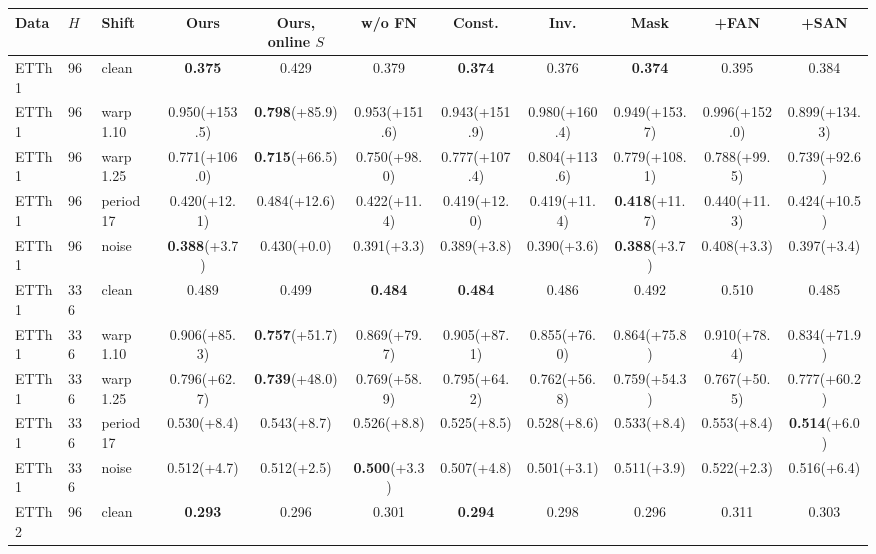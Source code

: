 \begin{tabular}{lllcccccccc}
\toprule
Data & $H$ & Shift & Ours & Ours, online $S$ & w/o FN & Const. & Inv. & Mask & +FAN & +SAN \\
\midrule
ETTh1 & 96 & clean & \textbf{0.375} & 0.429 & 0.379 & \textbf{0.374} & 0.376 & \textbf{0.374} & 0.395 & 0.384 \\
ETTh1 & 96 & warp 1.10 & 0.950\tiny{(+153.5)} & \textbf{0.798}\tiny{(+85.9)} & 0.953\tiny{(+151.6)} & 0.943\tiny{(+151.9)} & 0.980\tiny{(+160.4)} & 0.949\tiny{(+153.7)} & 0.996\tiny{(+152.0)} & 0.899\tiny{(+134.3)} \\
ETTh1 & 96 & warp 1.25 & 0.771\tiny{(+106.0)} & \textbf{0.715}\tiny{(+66.5)} & 0.750\tiny{(+98.0)} & 0.777\tiny{(+107.4)} & 0.804\tiny{(+113.6)} & 0.779\tiny{(+108.1)} & 0.788\tiny{(+99.5)} & 0.739\tiny{(+92.6)} \\
ETTh1 & 96 & period 17 & 0.420\tiny{(+12.1)} & 0.484\tiny{(+12.6)} & 0.422\tiny{(+11.4)} & 0.419\tiny{(+12.0)} & 0.419\tiny{(+11.4)} & \textbf{0.418}\tiny{(+11.7)} & 0.440\tiny{(+11.3)} & 0.424\tiny{(+10.5)} \\
ETTh1 & 96 & noise & \textbf{0.388}\tiny{(+3.7)} & 0.430\tiny{(+0.0)} & 0.391\tiny{(+3.3)} & 0.389\tiny{(+3.8)} & 0.390\tiny{(+3.6)} & \textbf{0.388}\tiny{(+3.7)} & 0.408\tiny{(+3.3)} & 0.397\tiny{(+3.4)} \\
\midrule
ETTh1 & 336 & clean & 0.489 & 0.499 & \textbf{0.484} & \textbf{0.484} & 0.486 & 0.492 & 0.510 & 0.485 \\
ETTh1 & 336 & warp 1.10 & 0.906\tiny{(+85.3)} & \textbf{0.757}\tiny{(+51.7)} & 0.869\tiny{(+79.7)} & 0.905\tiny{(+87.1)} & 0.855\tiny{(+76.0)} & 0.864\tiny{(+75.8)} & 0.910\tiny{(+78.4)} & 0.834\tiny{(+71.9)} \\
ETTh1 & 336 & warp 1.25 & 0.796\tiny{(+62.7)} & \textbf{0.739}\tiny{(+48.0)} & 0.769\tiny{(+58.9)} & 0.795\tiny{(+64.2)} & 0.762\tiny{(+56.8)} & 0.759\tiny{(+54.3)} & 0.767\tiny{(+50.5)} & 0.777\tiny{(+60.2)} \\
ETTh1 & 336 & period 17 & 0.530\tiny{(+8.4)} & 0.543\tiny{(+8.7)} & 0.526\tiny{(+8.8)} & 0.525\tiny{(+8.5)} & 0.528\tiny{(+8.6)} & 0.533\tiny{(+8.4)} & 0.553\tiny{(+8.4)} & \textbf{0.514}\tiny{(+6.0)} \\
ETTh1 & 336 & noise & 0.512\tiny{(+4.7)} & 0.512\tiny{(+2.5)} & \textbf{0.500}\tiny{(+3.3)} & 0.507\tiny{(+4.8)} & 0.501\tiny{(+3.1)} & 0.511\tiny{(+3.9)} & 0.522\tiny{(+2.3)} & 0.516\tiny{(+6.4)} \\
\midrule
ETTh2 & 96 & clean & \textbf{0.293} & 0.296 & 0.301 & \textbf{0.294} & 0.298 & 0.296 & 0.311 & 0.303 \\

\end{tabular}
